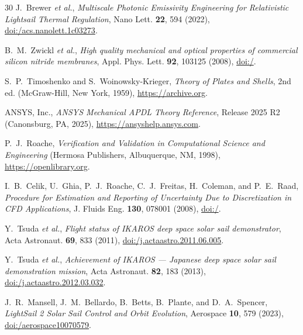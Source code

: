 \documentclass[aps,prd,reprint,superscriptaddress,nofootinbib,floatfix]{revtex4-2}
\begin{document}
\begin{thebibliography}{30}
 J.~Brewer \textit{et al.}, \textit{Multiscale Photonic Emissivity Engineering for Relativistic Lightsail Thermal Regulation}, Nano Lett. \textbf{22}, 594 (2022), \href{https://doi.org/10.1021/acs.nanolett.1c03273}{doi:/\allowbreak acs.nanolett.1c03273}.

 B.~M.~Zwickl \textit{et al.}, \textit{High quality mechanical and optical properties of commercial silicon nitride membranes}, Appl. Phys. Lett. \textbf{92}, 103125 (2008), \href{https://doi.org/10.1063/1.2884191}{doi:/}.

 S.~P.~Timoshenko and S.~Woinowsky-Krieger, \textit{Theory of Plates and Shells}, 2nd ed. (McGraw-Hill, New York, 1959), \href{https://archive.org/details/bwb_KR-212-587}{https://\allowbreak archive.org}.

 ANSYS, Inc., \textit{ANSYS Mechanical APDL Theory Reference}, Release 2025 R2 (Canonsburg, PA, 2025), \href{https://ansyshelp.ansys.com/public/account/secured?returnurl=/Views/Secured/corp/v242/en/ans_thry/ans_thry.html}{https://\allowbreak ansyshelp.ansys.com}.

 P.~J.~Roache, \textit{Verification and Validation in Computational Science and Engineering} (Hermosa Publishers, Albuquerque, NM, 1998), \href{https://openlibrary.org/books/OL400789M/Verification_and_validation_in_computational_science_and_engineering}{https://\allowbreak openlibrary.org}.

 I.~B.~Celik, U.~Ghia, P.~J.~Roache, C.~J.~Freitas, H.~Coleman, and P.~E.~Raad, \textit{Procedure for Estimation and Reporting of Uncertainty Due to Discretization in CFD Applications}, J. Fluids Eng. \textbf{130}, 078001 (2008), \href{https://doi.org/10.1115/1.2960953}{doi:/}.

 Y.~Tsuda \textit{et al.}, \textit{Flight status of IKAROS deep space solar sail demonstrator}, Acta Astronaut. \textbf{69}, 833 (2011), \href{https://doi.org/10.1016/j.actaastro.2011.06.005}{doi:/\allowbreak j.actaastro.2011.06.005}.

 Y.~Tsuda \textit{et al.}, \textit{Achievement of IKAROS --- Japanese deep space solar sail demonstration mission}, Acta Astronaut. \textbf{82}, 183 (2013), \href{https://doi.org/10.1016/j.actaastro.2012.03.032}{doi:/\allowbreak j.actaastro.2012.03.032}.

 J.~R.~Mansell, J.~M.~Bellardo, B.~Betts, B.~Plante, and D.~A.~Spencer, \textit{LightSail 2 Solar Sail Control and Orbit Evolution}, Aerospace \textbf{10}, 579 (2023), \href{https://doi.org/10.3390/aerospace10070579}{doi:/\allowbreak aerospace10070579}.


\end{thebibliography}
\end{document}
